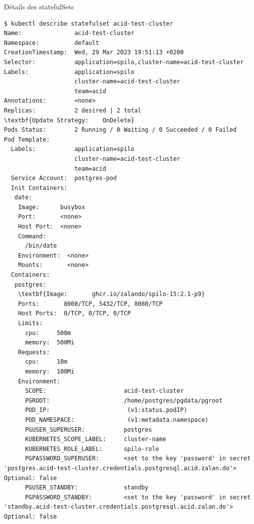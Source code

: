 
\begin{frame}[fragile,shrink=8]{Détails des statefulSets}

\begin{tiny}
\begin{Verbatim}[commandchars=\&\#\#]
$ kubectl describe statefulset acid-test-cluster
Name:               acid-test-cluster 
Namespace:          default         
CreationTimestamp:  Wed, 29 Mar 2023 19:51:13 +0200      
Selector:           application=spilo,cluster-name=acid-test-cluster
Labels:             application=spilo
                    cluster-name=acid-test-cluster
                    team=acid
Annotations:        <none>
Replicas:           2 desired | 2 total
\textbf{Update Strategy:    OnDelete}
Pods Status:        2 Running / 0 Waiting / 0 Succeeded / 0 Failed
Pod Template:
  Labels:           application=spilo
                    cluster-name=acid-test-cluster                           
                    team=acid
  Service Account:  postgres-pod
  Init Containers:
   date:                                                                                       
    Image:      busybox
    Port:       <none> 
    Host Port:  <none>
    Command:           
      /bin/date                 
    Environment:  <none>          
    Mounts:       <none>                                                                       
  Containers:             
   postgres:           
    \textbf{Image:       ghcr.io/zalando/spilo-15:2.1-p9}
    Ports:       8008/TCP, 5432/TCP, 8080/TCP
    Host Ports:  0/TCP, 0/TCP, 0/TCP
    Limits:                                                                                                                                                                                   
      cpu:     500m
      memory:  500Mi
    Requests:
      cpu:     10m
      memory:  100Mi
    Environment:
      SCOPE:                      acid-test-cluster
      PGROOT:                     /home/postgres/pgdata/pgroot
      POD_IP:                      (v1:status.podIP)
      POD_NAMESPACE:               (v1:metadata.namespace)
      PGUSER_SUPERUSER:           postgres
      KUBERNETES_SCOPE_LABEL:     cluster-name
      KUBERNETES_ROLE_LABEL:      spilo-role
      PGPASSWORD_SUPERUSER:       <set to the key 'password' in secret 'postgres.acid-test-cluster.credentials.postgresql.acid.zalan.do'>  Optional: false
      PGUSER_STANDBY:             standby
      PGPASSWORD_STANDBY:         <set to the key 'password' in secret 'standby.acid-test-cluster.credentials.postgresql.acid.zalan.do'>  Optional: false

\end{Verbatim}
\end{tiny}
\end{frame}
